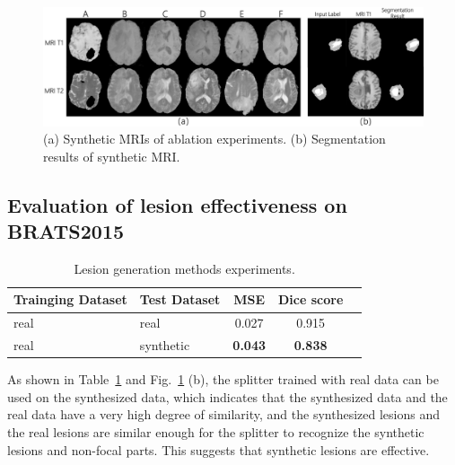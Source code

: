 \documentclass[runningheads]{llncs}
\begin{document}
\begin{figure}
	\centering
	\includegraphics[width=0.9\linewidth]{figures/ablation}
	\caption{(a) Synthetic MRIs of ablation experiments. (b) Segmentation results of synthetic MRI. }
	\label{ablation_and_seg}
\end{figure}

\subsection{Evaluation of lesion effectiveness on BRATS2015}
\label{label gen methods tests}
\begin{table}
	\begin{center}
		\caption{Lesion generation methods experiments.}
		\label{label_test}
		\begin{tabular}{llccc}
			\hline
			
			Trainging Dataset &Test Dataset &MSE   &Dice score \\
			\hline
				real &real 	    &0.027          &0.915 \\							
				real &synthetic	&\textbf{0.043} &\textbf{0.838} \\
			\hline
		\end{tabular}
	\end{center}
\end{table}
As shown in Table~\ref{label_test} and Fig.~\ref{ablation_and_seg} (b), the splitter trained with real data can be used on the synthesized data, which indicates that the synthesized data and the real data have a very high degree of similarity, and the synthesized lesions and the real lesions are similar enough for the splitter to recognize the synthetic lesions and non-focal parts. This suggests that synthetic lesions are effective.
\end{document}
